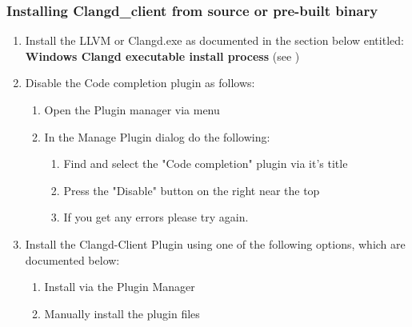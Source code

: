 \subsubsection{Installing Clangd\_client from source or pre-built binary}
\begin{enumerate}[noitemsep]
\item Install the LLVM or Clangd.exe as documented in the section below entitled: \\
          \textbf{Windows Clangd executable install process} (see )

\item Disable the Code completion plugin as follows:
    \begin{enumerate}[noitemsep]
    \item Open the Plugin manager via  \codeblocks menu \newline
    \item In the Manage Plugin dialog do the following:
        \begin{enumerate}[noitemsep]
        \item Find and select the "Code completion" plugin via it's title 
        \item Press the "Disable" button on the right near the top
        \item If you get any errors please try again.
        \end{enumerate}
    \end{enumerate}
	   
\item Install the Clangd-Client Plugin using one of the following options, which are documented below:
    \begin{enumerate}[noitemsep]
    \item Install via the Plugin Manager
    \item Manually install the plugin files
    \end{enumerate}
	

\end{enumerate}
